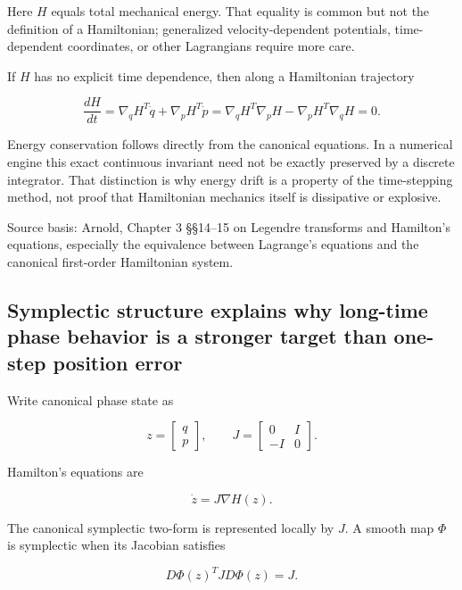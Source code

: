 Here \(H\) equals total mechanical energy. That equality is common but not the definition of a Hamiltonian; generalized velocity-dependent potentials, time-dependent coordinates, or other Lagrangians require more care.

If \(H\) has no explicit time dependence, then along a Hamiltonian trajectory

\[
\frac{dH}{dt}
=
\nabla_qH^T\dot q
+
\nabla_pH^T\dot p
=
\nabla_qH^T\nabla_pH
-
\nabla_pH^T\nabla_qH
=
0.
\]

Energy conservation follows directly from the canonical equations. In a numerical engine this exact continuous invariant need not be exactly preserved by a discrete integrator. That distinction is why energy drift is a property of the time-stepping method, not proof that Hamiltonian mechanics itself is dissipative or explosive.

Source basis: Arnold, Chapter 3 §§14--15 on Legendre transforms and Hamilton's equations, especially the equivalence between Lagrange's equations and the canonical first-order Hamiltonian system.

\subsection{Symplectic structure explains why long-time phase behavior is a stronger target than one-step position error}\label{02-foundations-ii-ch039-symplectic-structure-explains-why-long-time-phase-behavior-is-a-stronger-target-than-one-step-position-error}

\hypertarget{02-foundations-ii-ch039-symplectic-structure-explains-why-long-time-phase-behavior-is-a-stronger-target-than-one-step-position-error}{}

Write canonical phase state as

\[
z=
\begin{bmatrix}
q\\p
\end{bmatrix},
\qquad
J=
\begin{bmatrix}
0&I\\
-I&0
\end{bmatrix}.
\]

Hamilton's equations are

\[
\dot z
=
J\nabla H(z).
\]

The canonical symplectic two-form is represented locally by \(J\). A smooth map \(\Phi\) is symplectic when its Jacobian satisfies

\[
D\Phi(z)^T J D\Phi(z)=J.
\]


